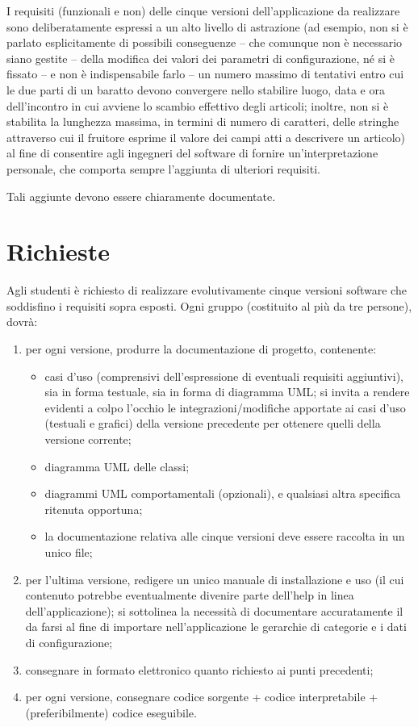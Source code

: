 I requisiti (funzionali e non) delle cinque versioni dell’applicazione da realizzare sono deliberatamente espressi a un alto livello di astrazione (ad esempio, non si è parlato esplicitamente di possibili conseguenze – che comunque non è necessario siano gestite – della modifica dei valori dei parametri di configurazione, né si è fissato – e non è indispensabile farlo – un numero massimo di tentativi entro cui le due parti di un baratto devono convergere nello stabilire luogo, data e ora dell’incontro in cui avviene lo scambio effettivo degli articoli; inoltre, non si è stabilita la lunghezza massima, in termini di numero di caratteri, delle stringhe attraverso cui il fruitore esprime il valore dei campi atti a descrivere un articolo) al fine di consentire agli ingegneri del software di fornire un’interpretazione personale, che comporta sempre l’aggiunta di ulteriori requisiti. \newline

Tali aggiunte devono essere chiaramente documentate.

\section{Richieste}
Agli studenti è richiesto di realizzare evolutivamente cinque versioni software che soddisfino i requisiti sopra esposti. Ogni gruppo (costituito al più da tre persone), dovrà: 
\begin{enumerate}
    \item per ogni versione, produrre la documentazione di progetto, contenente:
    \begin{itemize}
        \item casi d’uso (comprensivi dell’espressione di eventuali requisiti aggiuntivi), sia in forma testuale, sia in forma di diagramma UML; si invita a rendere evidenti a colpo l’occhio le integrazioni/modifiche apportate ai casi d’uso (testuali e grafici) della versione precedente per ottenere quelli della versione corrente;
        \item diagramma UML delle classi;
        \item diagrammi UML comportamentali (opzionali), e qualsiasi altra specifica ritenuta opportuna;
        \item la documentazione relativa alle cinque versioni deve essere raccolta in un unico file;
    \end{itemize}
    \item per l’ultima versione, redigere un unico manuale di installazione e uso (il cui contenuto potrebbe eventualmente divenire parte dell’help in linea dell’applicazione); si sottolinea la necessità di documentare accuratamente il da farsi al fine di importare nell’applicazione le gerarchie di categorie e i dati di configurazione;
    \item consegnare in formato elettronico quanto richiesto ai punti precedenti;
    \item per ogni versione, consegnare codice sorgente + codice interpretabile + (preferibilmente) codice eseguibile.
\end{enumerate}